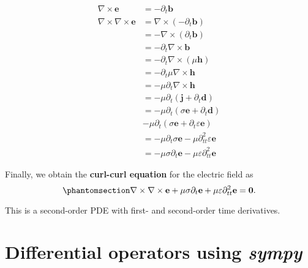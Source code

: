 \documentclass[
  a4paper,
  DIV=11,
  numbers=noendperiod]{scrreprt}
\begin{document}
\begin{tcolorbox}[enhanced jigsaw, rightrule=.15mm, opacitybacktitle=0.6, arc=.35mm, opacityback=0, leftrule=.75mm, colframe=quarto-callout-tip-color-frame, bottomtitle=1mm, left=2mm, toptitle=1mm, breakable, bottomrule=.15mm, colback=white, toprule=.15mm, titlerule=0mm, colbacktitle=quarto-callout-tip-color!10!white, title=\textcolor{quarto-callout-tip-color}{\faLightbulb}\hspace{0.5em}{Tip}, coltitle=black]

\[
\begin{align}
\nabla \times \mathbf e  & = -\partial_t \mathbf b \\
\nabla \times \nabla \times \mathbf e & = \nabla \times (-\partial_t \mathbf b) \\
  & = -\nabla \times (\partial_t \mathbf b) \\
  & = -\partial_t\nabla \times  \mathbf b \\
  & = -\partial_t\nabla \times ( \mu \mathbf h) \\
  & = -\partial_t \mu \nabla \times \mathbf h \\
  & = -\mu \partial_t \nabla \times \mathbf h \\
  & = -\mu \partial_t (\mathbf j + \partial_t \mathbf d) \\
  & = -\mu \partial_t (\sigma \mathbf e + \partial_t \mathbf d) \\
  & -\mu \partial_t (\sigma \mathbf e + \partial_t \varepsilon \mathbf e) \\
  & = -\mu \partial_t \sigma \mathbf e -\mu \partial^2_{tt} \varepsilon \mathbf e \\
  & = -\mu \sigma \partial_t \mathbf e -\mu \varepsilon \partial^2_{tt} \mathbf e
\end{align}
\]

\end{tcolorbox}

Finally, we obtain the \textbf{curl-curl equation} for the electric
field as \begin{equation}\phantomsection\label{eq-curlcurl}{
\nabla \times \nabla \times \mathbf e  +\mu \sigma \partial_t \mathbf e + \mu \varepsilon \partial^2_{tt} \mathbf e = \mathbf 0.
}\end{equation}

This is a second-order PDE with first- and second-order time
derivatives.

\chapter{\texorpdfstring{Differential operators using
\emph{sympy}}{Differential operators using sympy}}\label{differential-operators-using-sympy}
\end{document}
